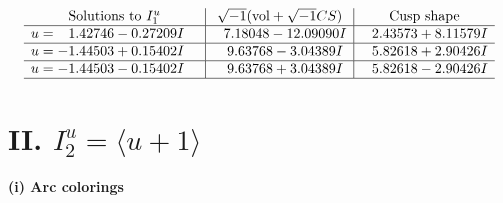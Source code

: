\documentclass[1p]{elsarticle_modified}
\theoremstyle{definition}
\newcommand{\I}{\sqrt{-1}}
\begin{document}
$$\begin{array}{c|c|c}
\text{Solutions to }I^u_{1}& \I (\text{vol} + \sqrt{-1}CS) & \text{Cusp shape}\\
 \hline 
\begin{aligned}
u &= \phantom{-}1.42746 - 0.27209 I\end{aligned}
 & \phantom{-}7.18048 - 12.09090 I & \phantom{-}2.43573 + 8.11579 I \\ \hline\begin{aligned}
u &= -1.44503 + 0.15402 I\end{aligned}
 & \phantom{-}9.63768 - 3.04389 I & \phantom{-}5.82618 + 2.90426 I \\ \hline\begin{aligned}
u &= -1.44503 - 0.15402 I\end{aligned}
 & \phantom{-}9.63768 + 3.04389 I & \phantom{-}5.82618 - 2.90426 I\\
 \hline 
 \end{array}$$\newpage\newpage\renewcommand{\arraystretch}{1}
\centering \section*{II. $I^u_{2}= \langle u+1 \rangle$}
\flushleft \textbf{(i) Arc colorings}\\
\end{document}
